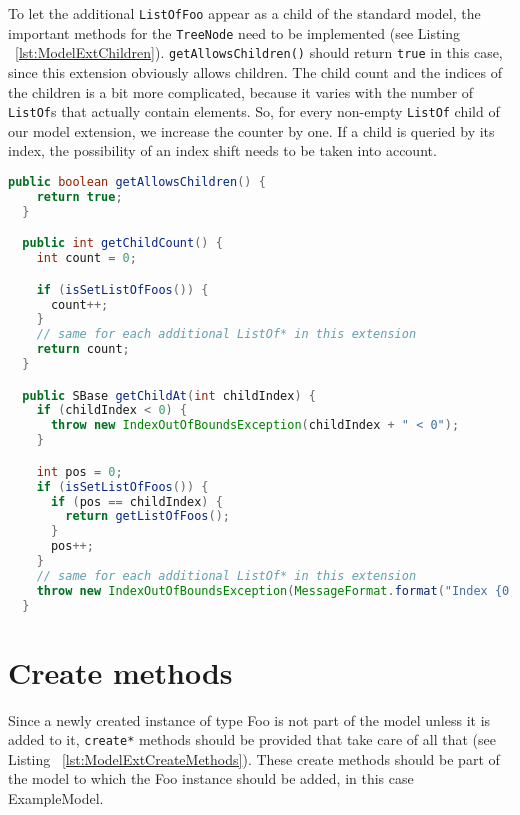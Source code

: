 To let the additional \texttt{ListOfFoo} appear as a child of the standard model, the important methods for the \texttt{TreeNode} need to be implemented (see Listing ~\vref{lst:ModelExtChildren}).
\texttt{getAllowsChildren()} should return \texttt{true} in this case, since this extension obviously allows children.
The child count and the indices of the children is a bit more complicated, because it varies with the number of \texttt{ListOf}s that actually contain elements.
So, for every non-empty \texttt{ListOf} child of our model extension, we increase the counter by one.
If a child is queried by its index, the possibility of an index shift needs to be taken into account.

\begin{lstlisting}[language=Java,caption={Methods which need to be implemented to make the children available in the extended model},label={lst:ModelExtChildren}]
  public boolean getAllowsChildren() {
    return true;
  }

  public int getChildCount() {
    int count = 0;

    if (isSetListOfFoos()) {
      count++;
    }
    // same for each additional ListOf* in this extension
    return count;
  }

  public SBase getChildAt(int childIndex) {
    if (childIndex < 0) {
      throw new IndexOutOfBoundsException(childIndex + " < 0");
    }

    int pos = 0;
    if (isSetListOfFoos()) {
      if (pos == childIndex) {
        return getListOfFoos();
      }
      pos++;
    }
    // same for each additional ListOf* in this extension
    throw new IndexOutOfBoundsException(MessageFormat.format("Index {0,number,integer} >= {1,number,integer}", childIndex, +((int) Math.min(pos, 0))));
  }
\end{lstlisting}



\section{Create methods}

Since a newly created instance of type Foo is not part of the model unless it is
added to it, \texttt{create*} methods should be provided that take care of all that (see Listing ~\ref{lst:ModelExtCreateMethods}).
These create methods should be part of the model to which the Foo instance should be added, in this case ExampleModel.

